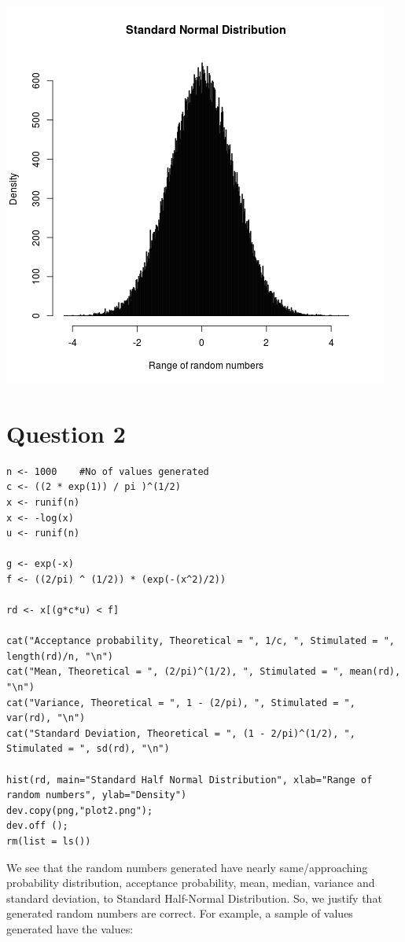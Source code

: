 \documentclass{article}
\begin{document}
\includegraphics{"plot1"}
\pagebreak

\section{Question 2}


\begin{lstlisting}
n <- 1000	 #No of values generated
c <- ((2 * exp(1)) / pi )^(1/2) 
x <- runif(n)
x <- -log(x)
u <- runif(n)

g <- exp(-x)
f <- ((2/pi) ^ (1/2)) * (exp(-(x^2)/2))

rd <- x[(g*c*u) < f]

cat("Acceptance probability, Theoretical = ", 1/c, ", Stimulated = ", length(rd)/n, "\n")
cat("Mean, Theoretical = ", (2/pi)^(1/2), ", Stimulated = ", mean(rd), "\n")
cat("Variance, Theoretical = ", 1 - (2/pi), ", Stimulated = ", var(rd), "\n")
cat("Standard Deviation, Theoretical = ", (1 - 2/pi)^(1/2), ", Stimulated = ", sd(rd), "\n")

hist(rd, main="Standard Half Normal Distribution", xlab="Range of random numbers", ylab="Density")
dev.copy(png,"plot2.png");
dev.off ();
rm(list = ls())
\end{lstlisting}

We see that the random numbers generated have nearly same/approaching probability distribution, acceptance probability, mean, median, variance and standard deviation, to Standard Half-Normal Distribution. So, we justify that generated random numbers are correct. For example, a sample of values generated have the values:
\end{document}
